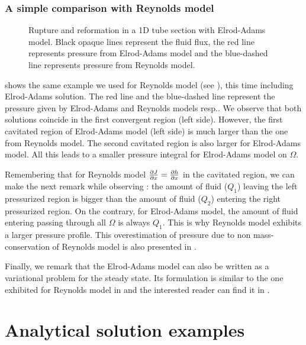 \subsubsection*{A simple comparison with Reynolds model}
\begin{figure}[ht!]
\centering 
\def\svgwidth{\textwidth}	
\caption[1D rupture and reformation scheme with Elrod-Adams model]{Rupture and reformation in a 1D tube section with Elrod-Adams model. Black opaque lines represent the fluid flux, the red line represents pressure from Elrod-Adams model and the blue-dashed line represents pressure from Reynolds model.}\label{fig:mass_cons_example2}
\end{figure}

 shows the same example we used for Reynolds model (see ), this time including Elrod-Adams solution. The red line and the blue-dashed line represent the pressure given by Elrod-Adams and Reynolds models resp.. We observe that both solutions coincide in the first convergent region (left side). However, the first cavitated region of Elrod-Adams model (left side) is much larger than the one from Reynolds model. The second cavitated region is also larger for Elrod-Adams model. All this leads to a smaller pressure integral for Elrod-Adams model on $\Omega$.

Remembering that for Reynolds model $\frac{\partial J}{\partial x}=\frac{\partial h}{\partial x}$ in the cavitated region, we can make the next remark while observing : the amount of fluid ($Q_1$) leaving the left  pressurized region is bigger than the amount of fluid ($Q_2$) entering the right pressurized region. On the contrary, for Elrod-Adams model, the amount of fluid entering passing through all $\Omega$ is always $Q_1$. This is why Reynolds model exhibits a larger pressure profile. This overestimation of pressure due to non mass-conservation of Reynolds model is also presented in \cite{ausas07,qiu2009}.

Finally, we remark that the Elrod-Adams model can also be written as a variational problem for the steady state. Its formulation is similar to the one exhibited for Reynolds model in  and the interested reader can find it in \cite{bayada1982}.

\section{Analytical solution examples}\label{sec:ex_analytic_sol}
